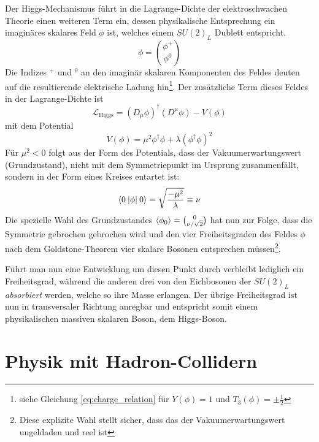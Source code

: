 Der Higgs-Mechanismus führt in die Lagrange-Dichte der elektroschwachen Theorie
einen weiteren Term ein, dessen physikalische Entsprechung ein imaginäres
skalares Feld $\phi$ ist, welches einem $SU(2)_L$ Dublett entspricht.
\begin{equation}
    \phi = \binom{\phi^+}{\phi^0}
\end{equation}
Die Indizes $^+$ und $^0$ an den imaginär skalaren Komponenten des Feldes
deuten auf die resultierende elektrische Ladung hin\footnote{siehe Gleichung
\ref{eq:charge_relation} für $Y(\phi)=1$ und $T_3(\phi)=\pm\tfrac{1}{2}$}.
Der zusätzliche Term dieses Feldes in der Lagrange-Dichte ist
\begin{equation}
    \mathcal{L}_\text{Higgs} = (D_\mu\phi)^\dagger(D^\mu\phi) - V(\phi)
\end{equation}
mit dem Potential
\begin{equation}
    V(\phi) = \mu^2\phi^\dagger\phi + \lambda (\phi^\dagger\phi )^2
\end{equation}
Für $\mu^2<0$ folgt aus der Form des Potentials, dass der Vakuumerwartungswert
(Grundzustand), nicht mit dem Symmetriepunkt im Ursprung zusammenfällt, sondern
in der Form eines Kreises entartet ist:
\begin{equation}
    \braket{0\:|\phi|\:0} = \sqrt{\frac{-\mu^2}{\lambda}} \equiv \nu 
\end{equation}
Die spezielle Wahl des Grundzustandes $\braket{\phi_0}=\binom{0}{\nu/\sqrt{2}}$
hat nun zur Folge, dass die Symmetrie gebrochen gebrochen wird und den vier
Freiheitsgraden des Feldes $\phi$ nach dem Goldstone-Theorem vier skalare
Bosonen entsprechen müssen\footnote{Diese explizite Wahl stellt sicher, dass
das der Vakuumerwartungswert ungeldaden und reel ist}.

Führt man nun eine Entwicklung um diesen Punkt durch verbleibt lediglich ein
Freiheitsgrad, während die anderen drei von den Eichbosonen der $SU(2)_L$
\textit{absorbiert} werden, welche so ihre Masse erlangen. Der übrige
Freiheitsgrad ist nun in transversaler Richtung anregbar und entspricht somit
einem physikalischen massiven skalaren Boson, dem Higgs-Boson.



\section{Physik mit Hadron-Collidern}
\label{theory:hadron_collider}

